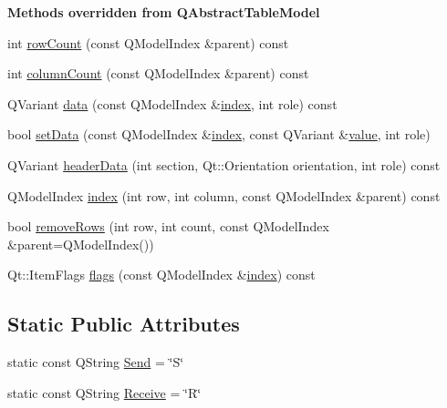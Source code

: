 \begin{Indent}{\bf Methods overridden from Q\+Abstract\+Table\+Model}\par
\begin{DoxyCompactItemize}
\item 
int \hyperlink{class_address_table_model_a22fda2951bb84dc5625e3180e3105e54}{row\+Count} (const Q\+Model\+Index \&parent) const 
\item 
int \hyperlink{class_address_table_model_ad55975a5bc64e848a9c62bd3562abb40}{column\+Count} (const Q\+Model\+Index \&parent) const 
\item 
Q\+Variant \hyperlink{class_address_table_model_a5ff6e3e2dab8b80428c4f59c4f1bc95a}{data} (const Q\+Model\+Index \&\hyperlink{class_address_table_model_a84f095bae13574410fceba53f8184abc}{index}, int role) const 
\item 
bool \hyperlink{class_address_table_model_a5c6bd467fd1fc499d126fe2b7380ce5c}{set\+Data} (const Q\+Model\+Index \&\hyperlink{class_address_table_model_a84f095bae13574410fceba53f8184abc}{index}, const Q\+Variant \&\hyperlink{cache_8cc_a0f61d63b009d0880a89c843bd50d8d76}{value}, int role)
\item 
Q\+Variant \hyperlink{class_address_table_model_a071e1b158705c96ed2b7859ded97caba}{header\+Data} (int section, Qt\+::\+Orientation orientation, int role) const 
\item 
Q\+Model\+Index \hyperlink{class_address_table_model_a84f095bae13574410fceba53f8184abc}{index} (int row, int column, const Q\+Model\+Index \&parent) const 
\item 
bool \hyperlink{class_address_table_model_a682e6e3374d65543e49769906c8916e5}{remove\+Rows} (int row, int count, const Q\+Model\+Index \&parent=Q\+Model\+Index())
\item 
Qt\+::\+Item\+Flags \hyperlink{class_address_table_model_a5334ed34ee290cb00772c89faf361eaa}{flags} (const Q\+Model\+Index \&\hyperlink{class_address_table_model_a84f095bae13574410fceba53f8184abc}{index}) const 
\end{DoxyCompactItemize}
\end{Indent}
\subsection*{Static Public Attributes}
\begin{DoxyCompactItemize}
\item 
static const Q\+String \hyperlink{class_address_table_model_a7c74e158d014a757c2edcc5bcb1e9a62}{Send} = \char`\"{}S\char`\"{}
\item 
static const Q\+String \hyperlink{class_address_table_model_acaed83193545456eab47dd7be1d2ceba}{Receive} = \char`\"{}R\char`\"{}
\end{DoxyCompactItemize}
